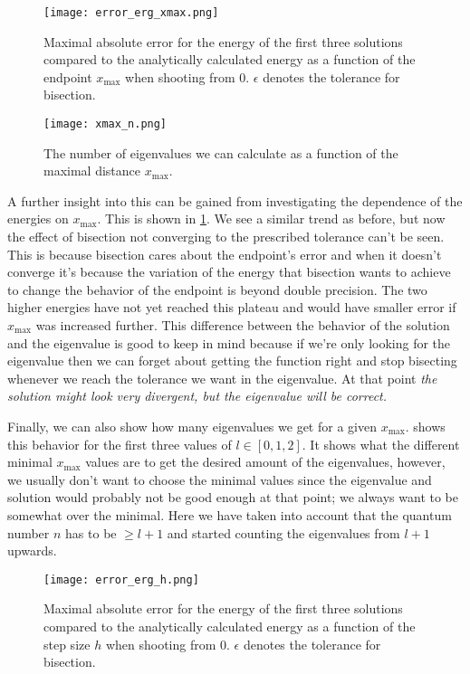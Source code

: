 \documentclass[10pt,a4paper,twocolumn]{article}
\begin{document}
\begin{figure}[!h]
    \centering
    \texttt{[image: error\_erg\_xmax.png]}
    \caption{Maximal absolute error for the energy of the first three solutions compared to the analytically calculated energy as a function of the endpoint $x_{\mathrm{max}}$ when shooting from $0$. $\epsilon$ denotes the tolerance for bisection.}
    \label{fig:error_erg_xmax}
\end{figure}

\begin{figure}[h]
    \centering
    \texttt{[image: xmax\_n.png]}
    \caption{The number of eigenvalues we can calculate as a function of the maximal distance $x_{\mathrm{max}}$.}
    \label{fig:xmax_n}
\end{figure}

A further insight into this can be gained from investigating the dependence of the energies on $x_{\mathrm{max}}$. This is shown in \cref{fig:error_erg_xmax}. We see a similar trend as before, but now the effect of bisection not converging to the prescribed tolerance can't be seen. This is because bisection cares about the endpoint's error and when it doesn't converge it's because the variation of the energy that bisection wants to achieve to change the behavior of the endpoint is beyond double precision. The two higher energies have not yet reached this plateau and would have smaller error if $x_{\mathrm{max}}$ was increased further. This difference between the behavior of the solution and the eigenvalue is good to keep in mind because if we're only looking for the eigenvalue then we can forget about getting the function right and stop bisecting whenever we reach the tolerance we want in the eigenvalue. At that point \emph{the solution might look very divergent, but the eigenvalue will be correct.}

Finally, we can also show how many eigenvalues we get for a given $x_{\mathrm{max}}$.  shows this behavior for the first three values of $l \in [0, 1, 2]$. It shows what the different minimal $x_{\mathrm{max}}$ values are to get the desired amount of the eigenvalues, however, we usually don't want to choose the minimal values since the eigenvalue and solution would probably not be good enough at that point; we always want to be somewhat over the minimal. Here we have taken into account that the quantum number $n$ has to be $\geq l + 1$ and started counting the eigenvalues from $l + 1$ upwards.

\begin{figure}[h]
    \centering
    \texttt{[image: error\_erg\_h.png]}
    \caption{Maximal absolute error for the energy of the first three solutions compared to the analytically calculated energy as a function of the step size $h$ when shooting from $0$. $\epsilon$ denotes the tolerance for bisection.}
    \label{fig:error_erg_h}
\end{figure}
\end{document}
